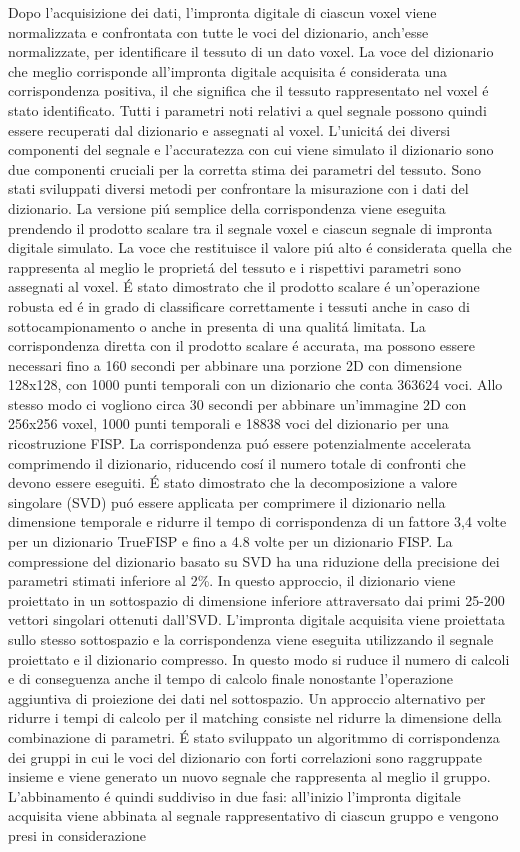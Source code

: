 \documentclass[a4paper,10pt]{article}
\begin{document}
 Dopo l'acquisizione dei dati, l'impronta digitale di ciascun voxel viene normalizzata e confrontata con tutte le voci del dizionario, anch'esse normalizzate, per identificare il tessuto di un dato voxel. La voce del dizionario che meglio corrisponde all'impronta digitale acquisita \'e considerata una corrispondenza positiva, il che significa che il tessuto rappresentato nel voxel \'e stato identificato. Tutti i parametri noti relativi a quel segnale possono quindi essere recuperati dal dizionario e assegnati al voxel. L'unicit\'a dei diversi componenti del segnale e l'accuratezza con cui viene simulato il dizionario sono due componenti cruciali per la corretta stima dei parametri del tessuto. Sono stati sviluppati diversi metodi per confrontare la misurazione con i dati del dizionario. La versione pi\'u semplice della corrispondenza viene eseguita prendendo il prodotto scalare tra il segnale voxel e ciascun segnale di impronta digitale simulato. La voce che restituisce il valore pi\'u alto \'e considerata quella che rappresenta al meglio le propriet\'a del tessuto e i rispettivi parametri sono assegnati al voxel. \'E stato dimostrato che il prodotto scalare \'e un'operazione robusta ed \'e in grado di classificare correttamente i tessuti anche in caso di sottocampionamento o anche in presenta di una qualit\'a limitata. La corrispondenza diretta con il prodotto scalare \'e accurata, ma possono essere necessari fino a 160 secondi per abbinare una porzione 2D con dimensione 128x128, con 1000 punti temporali con un  dizionario che conta 363624 voci. Allo stesso modo ci vogliono circa 30 secondi per abbinare un'immagine 2D con 256x256 voxel, 1000 punti temporali e 18838 voci del dizionario per una ricostruzione FISP. La corrispondenza pu\'o essere potenzialmente accelerata comprimendo il dizionario, riducendo cos\'i il numero totale di confronti che devono essere eseguiti. \'E stato dimostrato che la decomposizione a valore singolare (SVD) pu\'o essere applicata per comprimere il dizionario nella dimensione temporale e ridurre il tempo di corrispondenza di un fattore 3,4 volte per un dizionario TrueFISP e fino a 4.8 volte per un dizionario FISP. La compressione del dizionario basato su SVD ha una riduzione della precisione dei parametri stimati inferiore al 2\%. In questo approccio, il dizionario viene proiettato in un sottospazio di dimensione inferiore attraversato dai primi 25-200 vettori singolari ottenuti dall'SVD. L'impronta digitale acquisita viene proiettata sullo stesso sottospazio e la corrispondenza viene eseguita utilizzando il segnale proiettato e il dizionario compresso. In questo modo si ruduce il numero di calcoli e di conseguenza anche il tempo di calcolo finale nonostante l'operazione aggiuntiva di proiezione dei dati nel sottospazio. Un approccio alternativo per ridurre i tempi di calcolo per il matching consiste nel ridurre la dimensione della combinazione di parametri. \'E stato sviluppato un algoritmmo di corrispondenza dei gruppi in cui le voci del dizionario con forti correlazioni sono raggruppate insieme e viene generato un nuovo segnale che rappresenta al meglio il gruppo. L'abbinamento \'e quindi suddiviso in due fasi: all'inizio  l'impronta digitale acquisita viene abbinata al segnale rappresentativo di ciascun gruppo e vengono presi in considerazione 
\end{document}
